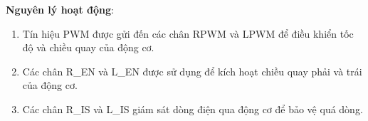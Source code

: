             \textbf{Nguyên lý hoạt động}:
            \begin{enumerate}
                \item Tín hiệu PWM được gửi đến các chân RPWM và LPWM để điều khiển tốc độ và chiều quay của động cơ.
                \item Các chân R\_EN và L\_EN được sử dụng để kích hoạt chiều quay phải và trái của động cơ.
                \item Các chân R\_IS và L\_IS giám sát dòng điện qua động cơ để bảo vệ quá dòng.
            \end{enumerate}
            
            